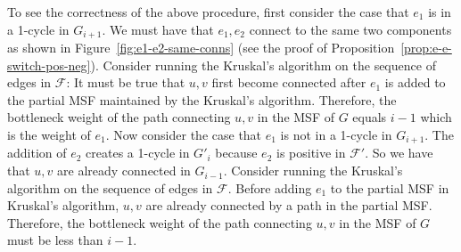 \documentclass[letterpaper,11pt]{article}
\theoremstyle{mythmstyle}
\theoremstyle{mydefstyle}
\theoremstyle{plain}
\theoremstyle{definition}
\newcommand{\<}[1]{\langle #1\rangle}
\newcommand{\Fcal}{\mathcal{F}}
\theoremstyle{definition}
\begin{document}
To see the correctness of the above procedure,
  first consider the case that $e_1$ is in a 1-cycle in $G_{i+1}$.
  We must have that $e_1,e_2$ connect to the same two components
  as shown in Figure~\ref{fig:e1-e2-same-conns}
  (see the proof of Proposition~\ref{prop:e-e-switch-pos-neg}).
  Consider running the Kruskal's algorithm on the sequence of edges in $\Fcal$:
  It must be true that 
  $u,v$ first become connected 
  after $e_1$ is added to the partial MSF maintained by the Kruskal's algorithm.
  Therefore, the bottleneck weight of the path connecting $u,v$ 
  in the MSF of $G$ 
  equals $i-1$ which is the weight of $e_1$.
  Now consider the case that $e_1$ is not in a 1-cycle in $G_{i+1}$.
  The addition of $e_2$ creates a 1-cycle in $G'_i$ because $e_2$
  is positive in $\Fcal'$.
  So we have that $u,v$
  are already connected in $G_{i-1}$.
  Consider running the Kruskal's algorithm on the sequence of edges in $\Fcal$.
  Before adding $e_1$ to the partial MSF in Kruskal's algorithm,
  $u,v$ are already connected by a path in the partial MSF.
  Therefore, the bottleneck weight of the path connecting $u,v$ 
  in the MSF of $G$ 
  must be less than $i-1$.
 
\end{document}

